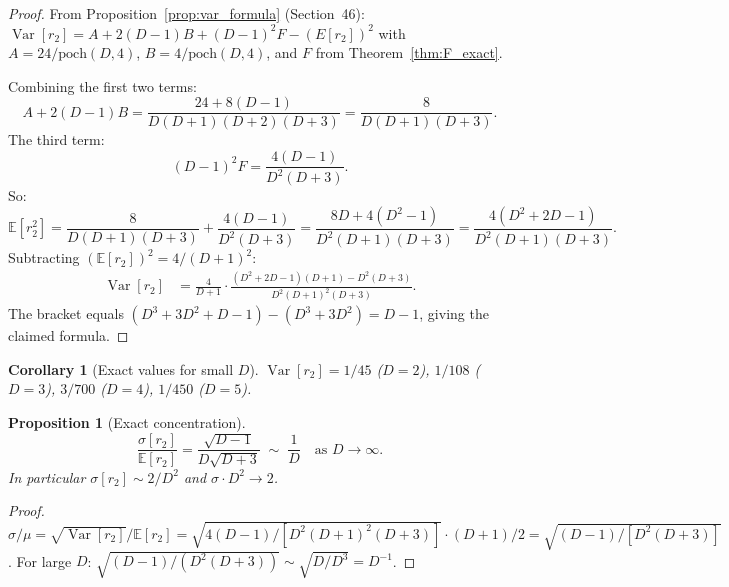 \documentclass[12pt,a4paper]{article}
\newtheorem{proposition}[theorem]{Proposition}
\newtheorem{corollary}[theorem]{Corollary}
\begin{document}
\begin{proof}
From Proposition~\ref{prop:var_formula} (Section~46):
$\operatorname{Var}[r_2] = A + 2(D-1)B + (D-1)^2 F - (E[r_2])^2$
with $A=24/\mathrm{poch}(D,4)$, $B=4/\mathrm{poch}(D,4)$, and $F$ from
Theorem~\ref{thm:F_exact}.

Combining the first two terms:
\[
  A+2(D-1)B = \frac{24+8(D-1)}{D(D+1)(D+2)(D+3)} = \frac{8}{D(D+1)(D+3)}.
\]
The third term:
\[
  (D-1)^2 F = \frac{4(D-1)}{D^2(D+3)}.
\]
So:
\[
  \mathbb{E}[r_2^2] = \frac{8}{D(D+1)(D+3)}+\frac{4(D-1)}{D^2(D+3)}
  = \frac{8D+4(D^2-1)}{D^2(D+1)(D+3)} = \frac{4(D^2+2D-1)}{D^2(D+1)(D+3)}.
\]
Subtracting $(\mathbb{E}[r_2])^2=4/(D+1)^2$:
\begin{align*}
  \operatorname{Var}[r_2] &= \frac{4}{D+1}\cdot
  \frac{(D^2+2D-1)(D+1)-D^2(D+3)}{D^2(D+1)^2(D+3)}.
\end{align*}
The bracket equals
$(D^3+3D^2+D-1)-(D^3+3D^2)=D-1$,
giving the claimed formula. \qedhere
\end{proof}

\begin{corollary}[Exact values for small $D$]
$\operatorname{Var}[r_2]=1/45$ ($D=2$),\; $1/108$ ($D=3$),\; $3/700$ ($D=4$),\; $1/450$ ($D=5$).
\end{corollary}

\begin{proposition}[Exact concentration]
\label{prop:exact_concentration}
\[
  \frac{\sigma[r_2]}{\mathbb{E}[r_2]}
  = \frac{\sqrt{D-1}}{D\sqrt{D+3}}
  \;\sim\; \frac{1}{D}
  \quad\text{as }D\to\infty.
\]
In particular $\sigma[r_2]\sim 2/D^2$ and $\sigma\cdot D^2\to 2$.
\end{proposition}

\begin{proof}
$\sigma/\mu=\sqrt{\operatorname{Var}[r_2]}/\mathbb{E}[r_2]
=\sqrt{4(D-1)/[D^2(D+1)^2(D+3)]}\cdot(D+1)/2
=\sqrt{(D-1)/[D^2(D+3)]}$.
For large $D$: $\sqrt{(D-1)/(D^2(D+3))}\sim\sqrt{D/D^3}=D^{-1}$.
\end{proof}
\end{document}
